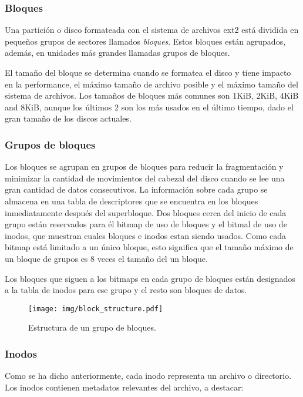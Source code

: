 \subsubsection{Bloques}
Una partición o disco formateada con el sistema de archivos ext2 está dividida en pequeños grupos de sectores llamados \emph{bloques}. Estos bloques están agrupados, además, en unidades más grandes llamadas grupos de bloques.

El tamaño del bloque se determina cuando se formatea el disco y tiene impacto en la performance, el máximo tamaño de archivo posible y el máximo tamaño del sistema de archivos. Los tamaños de bloques más comunes son 1KiB, 2KiB, 4KiB and 8KiB, aunque los últimos 2 son los más usados en el último tiempo, dado el gran tamaño de los discos actuales.

\subsubsection{Grupos de bloques}

Los bloques se agrupan en grupos de bloques para reducir la fragmentación y minimizar la cantidad de movimientos del cabezal del disco cuando se lee una gran cantidad de datos consecutivos. La información sobre cada grupo se almacena en una tabla de descriptores que se encuentra en los bloques inmediatamente después del superbloque. 
Dos bloques cerca del inicio de cada grupo están reservados para \'el bitmap de uso de bloques y el bitmal de uso de inodos, que muestran cuales bloques e inodos estan siendo usados.
Como cada bitmap está limitado a un único bloque, esto significa que el tamaño máximo de un bloque de grupos es 8 veces el tamaño del un bloque.

Los bloques que siguen a los bitmaps en cada grupo de bloques están designados a la tabla de inodos para ese grupo y el resto son bloques de datos.


\begin{figure}[H]
  \centering
  \texttt{[image: img/block\_structure.pdf]}
  \caption{Estructura de un grupo de bloques.}
\end{figure}

\subsubsection{Inodos}

Como se ha dicho anteriormente, cada inodo representa un archivo o directorio. Los inodos contienen metadatos relevantes del archivo, a destacar:

